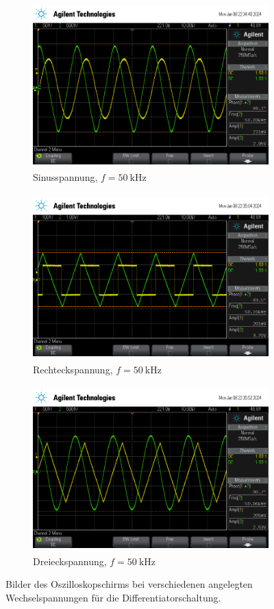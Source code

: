 \begin{figure}
  \begin{subfigure}[c]{0.9\textwidth}
    \centering
    \includegraphics[height=6.4cm]{content/scope/scope_8.png}
    \caption{Sinusspannung, $f=\qty{50}{\kilo\hertz}$}
  \end{subfigure}
  \begin{subfigure}[c]{0.9\textwidth}
    \centering
    \includegraphics[height=6.4cm]{content/scope/scope_9.png}
    \caption{Rechteckspannung, $f=\qty{50}{\kilo\hertz}$}
  \end{subfigure}
  \begin{subfigure}[c]{0.9\textwidth}
    \centering
    \includegraphics[height=6.4cm]{content/scope/scope_12.png}
    \caption{Dreieckspannung, $f=\qty{50}{\kilo\hertz}$}
  \end{subfigure}
  \caption{Bilder des Oszilloskopschirms bei verschiedenen angelegten Wechselspannungen für die Differentiatorschaltung.}
  \label{fig:scope_diff}
\end{figure}

